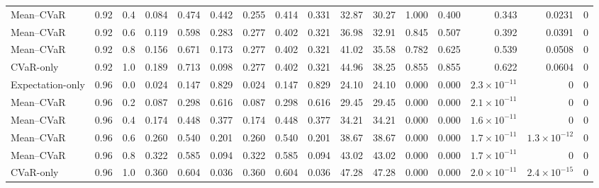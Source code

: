 \begin{table}[htbp]
{\begin{tabular}{lrrrrrrrrrrrrrrr}
Mean--CVaR & 0.92 & 0.4 & 0.084 & 0.474 & 0.442 & 0.255 & 0.414 & 0.331 & 32.87 & 30.27 & 1.000 & 0.400 & 0.343 & 0.0231 & 0\\
Mean--CVaR & 0.92 & 0.6 & 0.119 & 0.598 & 0.283 & 0.277 & 0.402 & 0.321 & 36.98 & 32.91 & 0.845 & 0.507 & 0.392 & 0.0391 & 0\\
Mean--CVaR & 0.92 & 0.8 & 0.156 & 0.671 & 0.173 & 0.277 & 0.402 & 0.321 & 41.02 & 35.58 & 0.782 & 0.625 & 0.539 & 0.0508 & 0\\
CVaR-only & 0.92 & 1.0 & 0.189 & 0.713 & 0.098 & 0.277 & 0.402 & 0.321 & 44.96 & 38.25 & 0.855 & 0.855 & 0.622 & 0.0604 & 0\\
\addlinespace[0.25em]
Expectation-only & 0.96 & 0.0 & 0.024 & 0.147 & 0.829 & 0.024 & 0.147 & 0.829 & 24.10 & 24.10 & 0.000 & 0.000 & $2.3\times10^{-11}$ & 0 & 0\\
Mean--CVaR & 0.96 & 0.2 & 0.087 & 0.298 & 0.616 & 0.087 & 0.298 & 0.616 & 29.45 & 29.45 & 0.000 & 0.000 & $2.1\times10^{-11}$ & 0 & 0\\
Mean--CVaR & 0.96 & 0.4 & 0.174 & 0.448 & 0.377 & 0.174 & 0.448 & 0.377 & 34.21 & 34.21 & 0.000 & 0.000 & $1.6\times10^{-11}$ & 0 & 0\\
Mean--CVaR & 0.96 & 0.6 & 0.260 & 0.540 & 0.201 & 0.260 & 0.540 & 0.201 & 38.67 & 38.67 & 0.000 & 0.000 & $1.7\times10^{-11}$ & $1.3\times10^{-12}$ & 0\\
Mean--CVaR & 0.96 & 0.8 & 0.322 & 0.585 & 0.094 & 0.322 & 0.585 & 0.094 & 43.02 & 43.02 & 0.000 & 0.000 & $1.7\times10^{-11}$ & 0 & 0\\
CVaR-only & 0.96 & 1.0 & 0.360 & 0.604 & 0.036 & 0.360 & 0.604 & 0.036 & 47.28 & 47.28 & 0.000 & 0.000 & $2.0\times10^{-11}$ & $2.4\times10^{-15}$ & 0\\
\bottomrule
\end{tabular}%
}
\end{table}
